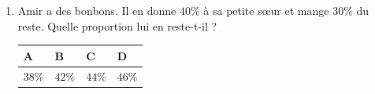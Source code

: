 \documentclass[oneside,12pt]{exam}          %
\begin{document}
\begin{enumerate}[label=\underline{Question \no\arabic*} :  , leftmargin=* , itemsep=5mm]
		

	\item Amir a des bonbons. Il en donne $40\%$ à sa petite sœur et mange $30\%$ du reste. Quelle proportion lui en reste-t-il ?
	
		\hspace{\linewidth-\textwidth}
		\renewcommand{\arraystretch}{1.5}
		\begin{tabular}{| P{0.22\textwidth} | P{0.22\textwidth} | P{0.22\textwidth} | P{0.22\textwidth} |} \hline
			A & B & C & D \\ \hline
			$38\%$ & $42\%$ & $44\%$ & $46\%$ \\ \hline
		\end{tabular}



\newpage
\end{enumerate}
\end{document}
